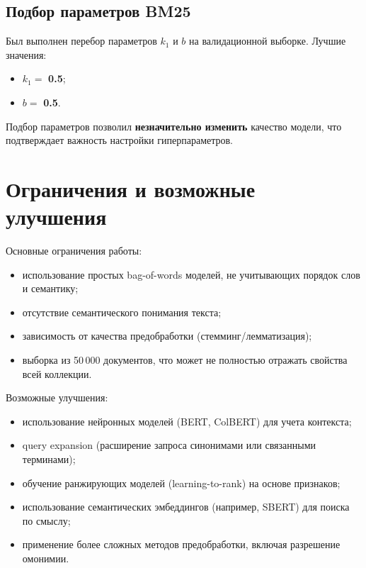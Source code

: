 \documentclass[11pt]{article}
\begin{document}
\subsection{Подбор параметров BM25}
Был выполнен перебор параметров $k_1$ и $b$ на валидационной выборке. Лучшие значения:
\begin{itemize}
    \item $k_1 = $ \textbf{0.5};
    \item $b = $ \textbf{0.5}.
\end{itemize}

Подбор параметров позволил \textbf{незначительно изменить} качество модели, что
подтверждает важность настройки гиперпараметров.

\section*{Ограничения и возможные улучшения}

Основные ограничения работы:
\begin{itemize}
    \item использование простых bag-of-words моделей, не учитывающих порядок слов
    и семантику;
    \item отсутствие семантического понимания текста;
    \item зависимость от качества предобработки (стемминг/лемматизация);
    \item выборка из 50\,000 документов, что может не полностью отражать свойства
    всей коллекции.
\end{itemize}

Возможные улучшения:
\begin{itemize}
    \item использование нейронных моделей (BERT, ColBERT) для учета контекста;
    \item query expansion (расширение запроса синонимами или связанными терминами);
    \item обучение ранжирующих моделей (learning-to-rank) на основе признаков;
    \item использование семантических эмбеддингов (например, SBERT) для поиска по смыслу;
    \item применение более сложных методов предобработки, включая разрешение омонимии.
\end{itemize}
\end{document}
